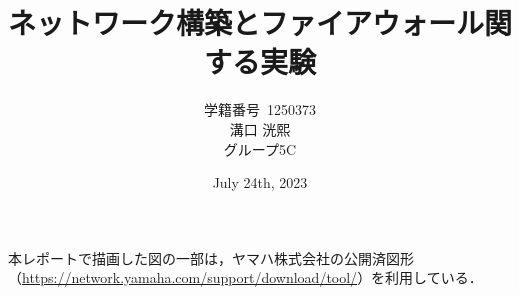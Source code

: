\documentclass[titlepage]{ltjsarticle}
\title{ネットワーク構築とファイアウォール関する実験}
\author{学籍番号~1250373\\溝口 洸熙\\グループ5C}
\date{July 24th, 2023}
\begin{document}






本レポートで描画した図の一部は，ヤマハ株式会社の公開済図形（\url{https://network.yamaha.com/support/download/tool/}）を利用している．
\end{document}
